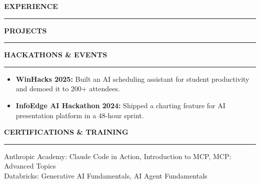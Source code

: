 \documentclass{resume}
\newcommand{\bulletgap}{-3pt}   %
\def\sectionskip{\vspace{12pt}}     %
\renewenvironment{rSection}[1]{%
  \sectionskip
  {\large\bfseries\MakeUppercase{#1}}%
  \sectionlineskip
  \hrule
  \begin{list}{}{\setlength{\leftmargin}{0em}}
  \item[]
}{%
  \end{list}
  \vspace{-0.5em}
}
\begin{document}
\begin{rSection}{Experience}
\begin{rSection}{Projects}
\vspace{4pt}
\end{rSection}


\begin{rSection}{Hackathons \& Events}
\begin{itemize}[leftmargin=0.15in]
    \itemsep \bulletgap {}
    \item \textbf{WinHacks 2025:} Built an AI scheduling assistant for student productivity and demoed it to 200+ attendees.
    \item \textbf{InfoEdge AI Hackathon 2024:} Shipped a charting feature for AI presentation platform in a 48-hour sprint.
\end{itemize}
\end{rSection}
\begin{rSection}{Certifications \& Training}
Anthropic Academy: Claude Code in Action, Introduction to MCP, MCP: Advanced Topics\\[2pt]
Databricks: Generative AI Fundamentals, AI Agent Fundamentals 
\end{rSection}
\end{rSection}
\end{document}
